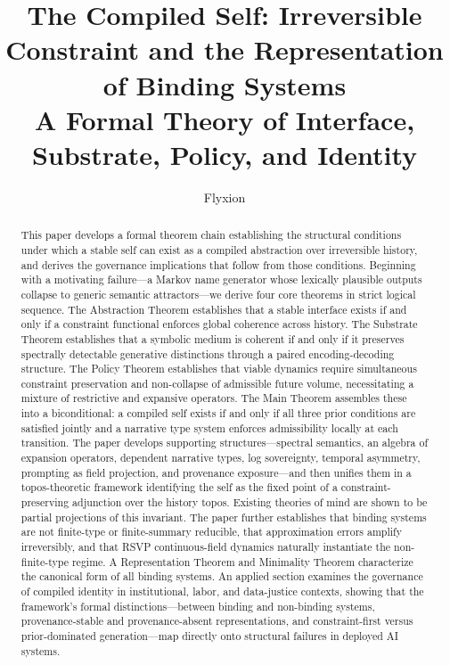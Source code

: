 \documentclass[12pt, a4paper]{article}
\title{\textbf{The Compiled Self: Irreversible Constraint and the Representation of Binding Systems}\\[0.5em]
\large A Formal Theory of Interface, Substrate, Policy, and Identity}
\author{Flyxion}
\date{}
\theoremstyle{plain}
\theoremstyle{definition}
\theoremstyle{remark}
\begin{document}
\maketitle

\begin{abstract}
This paper develops a formal theorem chain establishing the structural conditions under which a stable self can exist as a compiled abstraction over irreversible history, and derives the governance implications that follow from those conditions. Beginning with a motivating failure---a Markov name generator whose lexically plausible outputs collapse to generic semantic attractors---we derive four core theorems in strict logical sequence. The Abstraction Theorem establishes that a stable interface exists if and only if a constraint functional enforces global coherence across history. The Substrate Theorem establishes that a symbolic medium is coherent if and only if it preserves spectrally detectable generative distinctions through a paired encoding-decoding structure. The Policy Theorem establishes that viable dynamics require simultaneous constraint preservation and non-collapse of admissible future volume, necessitating a mixture of restrictive and expansive operators. The Main Theorem assembles these into a biconditional: a compiled self exists if and only if all three prior conditions are satisfied jointly and a narrative type system enforces admissibility locally at each transition. The paper develops supporting structures---spectral semantics, an algebra of expansion operators, dependent narrative types, log sovereignty, temporal asymmetry, prompting as field projection, and provenance exposure---and then unifies them in a topos-theoretic framework identifying the self as the fixed point of a constraint-preserving adjunction over the history topos. Existing theories of mind are shown to be partial projections of this invariant. The paper further establishes that binding systems are not finite-type or finite-summary reducible, that approximation errors amplify irreversibly, and that RSVP continuous-field dynamics naturally instantiate the non-finite-type regime. A Representation Theorem and Minimality Theorem characterize the canonical form of all binding systems. An applied section examines the governance of compiled identity in institutional, labor, and data-justice contexts, showing that the framework's formal distinctions---between binding and non-binding systems, provenance-stable and provenance-absent representations, and constraint-first versus prior-dominated generation---map directly onto structural failures in deployed AI systems.
\end{abstract}
\end{document}
